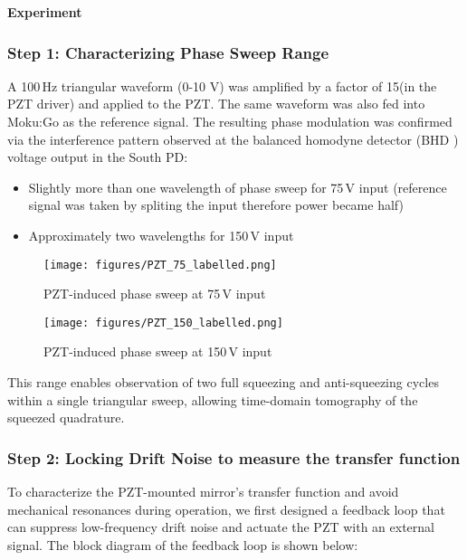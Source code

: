 \documentclass[colorlinks=true,pdfstartview=FitV,linkcolor=blue,
citecolor=red,urlcolor=magenta]{ligodoc}
\begin{document}
\textbf{Experiment}

\subsubsection*{Step 1: Characterizing Phase Sweep Range}

A 100\,Hz triangular waveform (0-10 V) was amplified by a factor of 15(in the PZT driver) and applied to the PZT. The same waveform was also fed into Moku:Go as the reference signal. The resulting phase modulation was confirmed via the interference pattern observed at the balanced homodyne detector (BHD ) voltage output in the South PD:

\begin{itemize}
    \item Slightly more than one wavelength of phase sweep for 75\,V input (reference signal was taken by spliting the input therefore power became half)
    \item Approximately two wavelengths for 150\,V input
\end{itemize}

\begin{figure}[H]
    \centering
    \texttt{[image: figures/PZT\_75\_labelled.png]}
    \caption{PZT-induced phase sweep at 75\,V input}
\end{figure}

\begin{figure}[H]
    \centering
    \texttt{[image: figures/PZT\_150\_labelled.png]}
    \caption{PZT-induced phase sweep at 150\,V input}
\end{figure}

This range enables observation of two full squeezing and anti-squeezing cycles within a single triangular sweep, allowing time-domain tomography of the squeezed quadrature.

\subsubsection*{Step 2:  Locking Drift Noise to measure the transfer function}

To characterize the PZT-mounted mirror’s transfer function and avoid mechanical resonances during operation, we first designed a feedback loop that can suppress low-frequency drift noise and actuate the PZT with an external signal. The block diagram of the feedback loop is shown below:
\end{document}
